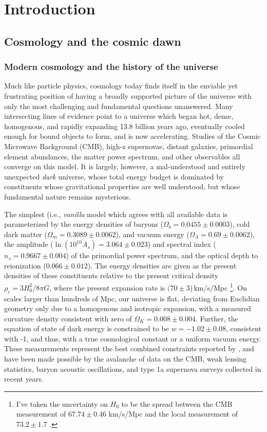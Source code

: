 \chapter{Introduction}


\section{Cosmology and the cosmic dawn}

\subsection{Modern cosmology and the history of the universe}

Much like particle physics, cosmology today finds itself in the enviable yet frustrating position of having a broadly supported picture of the universe with only the most challenging and fundamental questions unanswered. Many intersecting lines of evidence point to a universe which began hot, dense, homogenous, and rapidly expanding 13.8 billion years ago, eventually cooled enough for bound objects to form, and is now accelerating. Studies of the Cosmic Microwave Background (CMB), high-z supernovae, distant galaxies, primordial element abundances, the matter power spectrum, and other observables all converge on this model. It is largely, however, a mal-understood and entirely unexpected \textit{dark} universe, whose total energy budget is dominated by constituents whose gravitational properties are well understood, but whose fundamental nature remains mysterious. 

The simplest (i.e., \textit{vanilla} model which agrees with all available data is parameterized by the energy densities of baryons ($\Omega_b=0.0455\pm0.0003$), cold dark matter  ($\Omega_m=0.3089\pm0.0062$), and vacuum energy ($\Omega_\Lambda=0.69\pm0.0062$), the amplitude ($\ln (10^{10}A_s)=3.064\pm0.023$) and spectral index ($n_s=0.9667\pm0.004$) of the primordial power spectrum, and the optical depth to reionization ($0.066\pm0.012$). 
The energy densities are given as the present densities of these constituents relative to the present critical density $\rho_c=3H_0^2/8\pi G$, where the present expansion rate is $(70\pm3$)\,km/s/Mpc
\footnote{I've taken the uncertainty on $H_0$ to be the spread between the CMB measurement of $67.74\pm0.46$ km/s/Mpc \citep{planck16} and the local measurement of $73.2\pm1.7$ \citep{reiss16}.}. 
On scales larger than hundreds of Mpc, our universe is flat, deviating from Euclidian geometry only due to a homogenous and isotropic expansion, with a measured curvature density consistent with zero of $\Omega_K=0.008\pm0.004$. 
Further, the equation of state of dark energy is constrained to be $w=-1.02\pm0.08$, consistent with -1, and thus, with a true cosmological constant or a uniform vacuum energy. These measurements represent the best combined constraints reported by \citet{planck16}, and have been made possible by the avalanche of data on the CMB, weak lensing statistics, baryon acoustic oscillations, and type 1a supernova surveys collected in recent years. 


